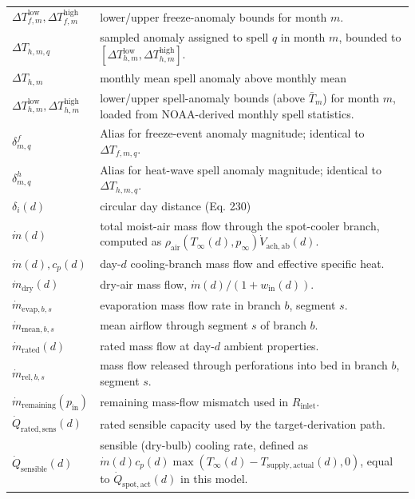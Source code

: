{\begin{longtable}[]{@{}
  >{\raggedright\arraybackslash}p{}
  >{\raggedright\arraybackslash}p{}@{}}
\(\Delta T_{f,m}^{\mathrm{low}},\Delta T_{f,m}^{\mathrm{high}}\) &
lower/upper freeze-anomaly bounds for month \(m\). \\
\(\Delta T_{h,m,q}\) & sampled anomaly assigned to spell \(q\) in month
\(m\), bounded to
\([\Delta T_{h,m}^{\mathrm{low}},\Delta T_{h,m}^{\mathrm{high}}]\). \\
\(\Delta T_{h,m}\) & monthly mean spell anomaly above monthly mean \\
\(\Delta T_{h,m}^{\mathrm{low}},\Delta T_{h,m}^{\mathrm{high}}\) &
lower/upper spell-anomaly bounds (above \(\bar T_m\)) for month \(m\),
loaded from NOAA-derived monthly spell statistics. \\
\(\delta^f_{m,q}\) & Alias for freeze-event anomaly magnitude; identical
to \(\Delta T_{f,m,q}\). \\
\(\delta^h_{m,q}\) & Alias for heat-wave spell anomaly magnitude;
identical to \(\Delta T_{h,m,q}\). \\
\(\delta_i(d)\) & circular day distance (Eq. 230) \\
\(\dot m(d)\) & total moist-air mass flow through the spot-cooler
branch, computed as
\(\rho_{\mathrm{air}}(T_\infty(d),p_\infty)\dot V_{\mathrm{ach},\mathrm{ab}}(d)\). \\
\(\dot m(d),c_p(d)\) & day-\(d\) cooling-branch mass flow and effective
specific heat. \\
\(\dot m_{\mathrm{dry}}(d)\) & dry-air mass flow,
\(\dot m(d)/(1+w_{\mathrm{in}}(d))\). \\
\(\dot m_{\mathrm{evap},b,s}\) & evaporation mass flow rate in branch
\(b\), segment \(s\). \\
\(\dot m_{\mathrm{mean},b,s}\) & mean airflow through segment \(s\) of
branch \(b\). \\
\(\dot m_{\mathrm{rated}}(d)\) & rated mass flow at day-\(d\) ambient
properties. \\
\(\dot m_{\mathrm{rel},b,s}\) & mass flow released through perforations
into bed in branch \(b\), segment \(s\). \\
\(\dot m_{\mathrm{remaining}}(p_{\mathrm{in}})\) & remaining mass-flow
mismatch used in \(R_{\mathrm{inlet}}\). \\
\(\dot Q_{\mathrm{rated,sens}}(d)\) & rated sensible capacity used by
the target-derivation path. \\
\(\dot Q_{\mathrm{sensible}}(d)\) & sensible (dry-bulb) cooling rate,
defined as
\(\dot m(d)c_p(d)\max(T_\infty(d)-T_{\mathrm{supply,actual}}(d),0)\),
equal to \(\dot Q_{\mathrm{spot,act}}(d)\) in this model. \\

\end{longtable}}
